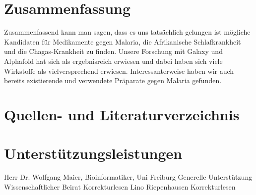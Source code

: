 \documentclass[11pt]{article}
\begin{document}


    \section{Zusammenfassung}\label{sec:zusammenfassung}
    Zusammenfassend kann man sagen, dass es uns tatsächlich gelungen ist mögliche Kandidaten für Medikamente gegen Malaria, die Afrikanische Schlafkrankheit und die Chagas-Krankheit zu finden. Unsere Forschung mit Galaxy und Alphafold hat sich als ergebnisreich erwiesen und dabei haben sich viele Wirkstoffe als vielversprechend erwiesen. Interessanterweise haben wir auch bereits existierende und verwendete Präparate gegen Malaria gefunden.



    \section{Quellen- und Literaturverzeichnis}\label{sec:quellen--und-literaturverzeichnis}



    \section{Unterstützungsleistungen}\label{sec:unterstuetzungsleistungen}

    Herr Dr. Wolfgang Maier, Bioinformatiker, Uni Freiburg
    Generelle Unterstützung
    Wissenschaftlicher Beirat
    Korrekturlesen
    Lino Riepenhausen
    Korrekturlesen
\end{document}
